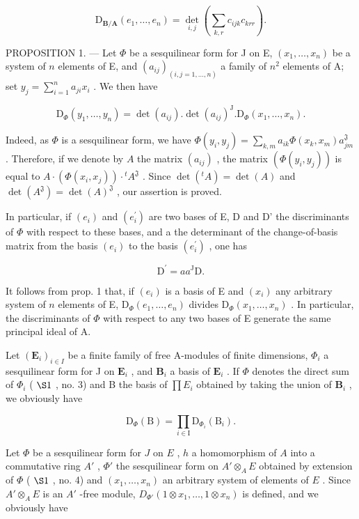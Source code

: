 \[
\mathrm{D} _ {\mathbf {B} / \mathbf {A}} (e _ {1}, \dots , e _ {n}) = \det _ {i, j} (\sum_ {k, r} c _ {i j k} c _ {k r r}).\tag{3}
\]

PROPOSITION 1. — Let \(\Phi\) be a sesquilinear form for J on E, \((x_1,\ldots,x_n)\) be a system of \(n\) elements of E, and \((a_{ij})_{(i,j=1,\ldots,n)}\) a family of \(n^2\) elements of A; set \(y_j = \sum_{i=1}^{n} a_{ji} x_i\) . We then have

\[
\mathrm{D} _ {\Phi} (y _ {1}, \dots , y _ {n}) = \det (a _ {i j}). \det (a _ {i j}) ^ {\mathrm{J}}. \mathrm{D} _ {\Phi} (x _ {1}, \dots , x _ {n}).
\]

Indeed, as \(\Phi\) is a sesquilinear form, we have \(\Phi(y_i, y_j) = \sum_{k,m} a_{ik} \Phi(x_k, x_m) a_{jm}^{\mathfrak{J}}\) . Therefore, if we denote by \(A\) the matrix \((a_{ij})\) , the matrix \((\Phi(y_i, y_j))\) is equal to \(A \cdot (\Phi(x_i, x_j)) \cdot {}^t A^{\mathfrak{J}}\) . Since \(\det(^t A) = \det(A)\) and \(\det(A^{\mathfrak{J}}) = \det(A)^{\mathfrak{J}}\) , our assertion is proved.

In particular, if \((e_{i})\) and \((e_{i}^{\prime})\) are two bases of E, D and D' the discriminants of \(\Phi\) with respect to these bases, and a the determinant of the change-of-basis matrix from the basis \((e_{i})\) to the basis \((e_{i}^{\prime})\) , one has

\[
\mathrm{D} ^ {\prime} = a a ^ {\mathrm{J}} \mathrm{D}.\tag{4}
\]

It follows from prop. 1 that, if \((e_i)\) is a basis of E and \((x_i)\) any arbitrary system of \(n\) elements of E, \(\mathrm{D}_{\Phi}(e_1,\ldots ,e_n)\) divides \(\mathrm{D}_{\Phi}(x_1,\dots,x_n)\) . In particular, the discriminants of \(\Phi\) with respect to any two bases of E generate the same principal ideal of A.

Let \((\mathbf{E}_i)_{i\in I}\) be a finite family of free A-modules of finite dimensions, \(\Phi_i\) a sesquilinear form for J on \(\mathbf{E}_i\) , and \(\mathbf{B}_i\) a basis of \(\mathbf{E}_i\) . If \(\Phi\) denotes the direct sum of \(\Phi_i\) ( \(\S 1\) , no. 3) and B the basis of \(\prod E_i\) obtained by taking the union of \(\mathbf{B}_i\) , we obviously have

\[
\mathrm{D} _ {\Phi} (\mathrm{B}) = \prod_ {i \in \mathrm{I}} \mathrm{D} _ {\Phi_ {i}} (\mathrm{B} _ {i}).\tag{5}
\]

Let \(\Phi\) be a sesquilinear form for \(J\) on \(E\) , \(h\) a homomorphism of \(A\) into a commutative ring \(A'\) , \(\Phi'\) the sesquilinear form on \(A' \otimes_A E\) obtained by extension of \(\Phi\) ( \(\S 1\) , no. 4) and \((x_1, \ldots, x_n)\) an arbitrary system of elements of \(E\) . Since \(A' \otimes_A E\) is an \(A'\) -free module, \(D_{\Phi'}(1 \otimes x_1, \ldots, 1 \otimes x_n)\) is defined, and we obviously have

